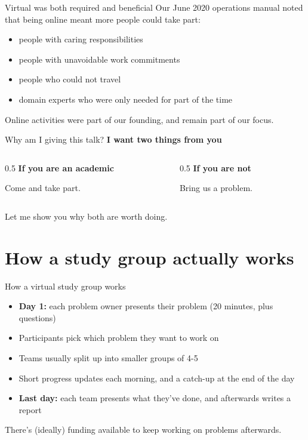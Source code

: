 \documentclass[aspectratio=169,11pt]{beamer}
\begin{document}
\begin{frame}{Virtual was both required and beneficial}
  Our June 2020 operations manual noted that being online meant more people could take part:
  \begin{itemize}
    \item people with caring responsibilities
    \item people with unavoidable work commitments
    \item people who could not travel
    \item domain experts who were only needed for part of the time
  \end{itemize}
  \vfill

  \vfill
  Online activities were part of our founding, and remain part of our focus.
\end{frame}

\begin{frame}{Why am I giving this talk?}
\textbf{I want two things from you}

  \begin{columns}[T]
    \begin{column}{0.5\textwidth}
      \textbf{If you are an academic}

      \vspace{1em}
      Come and take part.
    \end{column}
    \begin{column}{0.5\textwidth}
      \textbf{If you are not}

      \vspace{1em}
      Bring us a problem.
    \end{column}
  \end{columns}
  \vfill
  Let me show you why both are worth doing.
\end{frame}

\section{How a study group actually works}

\begin{frame}{How a virtual study group works}
  \begin{itemize}
    \item \textbf{Day 1:} each problem owner presents their problem
      (20 minutes, plus questions)
    \item Participants pick which problem they want to work on
    \item Teams usually split up into smaller groups of 4-5
    \item Short progress updates each morning, and a catch-up at the end of the day
    \item \textbf{Last day:} each team presents what they've done, and
      afterwards writes a report
  \end{itemize}
  \vfill
  There's (ideally) funding available to keep working on problems afterwards.
\end{frame}
\end{document}
